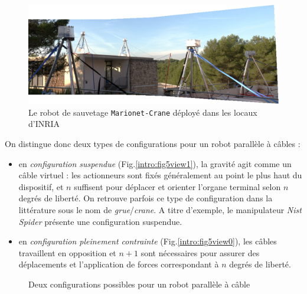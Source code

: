 \begin{figure}[!ht]
  \centering
\includegraphics[width=.95\linewidth]{./chapter0/figures/marionet_crane.jpg}
    \caption{\footnotesize Le robot de sauvetage {\tt Marionet-Crane} 
d\'eploy\'e dans les locaux d'INRIA}
\label{intro:fig4b}
\end{figure}

On distingue donc deux types de configurations pour un robot parallèle à câbles 
:
\begin{itemize}
 \item en {\it configuration suspendue} (Fig.\ref{intro:fig5view1}), la gravité 
agit comme un câble virtuel : les actionneurs sont fixés généralement au point 
le plus haut du dispositif, et $n$ suffisent pour déplacer et orienter l'organe 
terminal selon $n$ degrés de liberté. On retrouve parfois ce type de 
configuration dans la littérature sous le nom de {\it grue}/{\it crane}. A 
titre d'exemple, le manipulateur {\it Nist Spider} 
\cite{1992:Albus.Bostelman.ea} présente une configuration suspendue.
 \item en {\it configuration pleinement contrainte} 
(Fig.\ref{intro:fig5view0}), 
les câbles travaillent en opposition et $n+1$ sont nécessaires pour assurer des 
déplacements et l'application de forces correspondant à $n$ degrés de liberté.
\end{itemize}

\begin{figure}[!ht]
  \centering
\hfill
    \caption{\footnotesize Deux configurations possibles pour un robot 
parallèle 
à câble}
\label{intro:fig5}
\end{figure}

